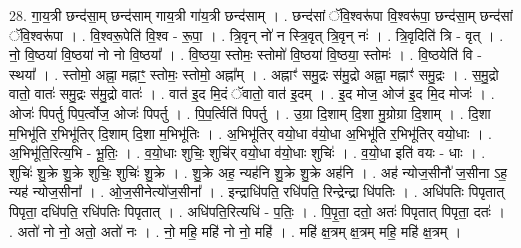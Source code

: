 \documentclass[17pt]{extarticle}
\begin{document}
28. गा॒य॒त्री छन्द॑सा॒म् छन्द॑साम् गाय॒त्री गा॑य॒त्री छन्द॑साम् । . छन्द॑सां ॅवि॒श्वरू॑पा वि॒श्वरू॑पा॒ छन्द॑सा॒म् छन्द॑सां ॅवि॒श्वरू॑पा । . वि॒श्वरू॒पेति॑ वि॒श्व - रू॒पा॒ । . त्रि॒वृन् नो॑ न स्त्रि॒वृत् त्रि॒वृन् नः॑ । . त्रि॒वृदिति॑ त्रि - वृत् । . नो॒ वि॒ष्ठया॑ वि॒ष्ठया॑ नो नो वि॒ष्ठया᳚ । . वि॒ष्ठया॒ स्तोमः॒ स्तोमो॑ वि॒ष्ठया॑ वि॒ष्ठया॒ स्तोमः॑ । . वि॒ष्ठयेति॑ वि - स्थया᳚ । . स्तोमो॒ अह्ना॒ मह्नाꣳ॒॒ स्तोमः॒ स्तोमो॒ अह्ना᳚म् । . अह्नाꣳ॑ समु॒द्रः स॑मु॒द्रो अह्ना॒ मह्नाꣳ॑ समु॒द्रः । . स॒मु॒द्रो वातो॒ वातः॑ समु॒द्रः स॑मु॒द्रो वातः॑ । . वात॑ इ॒द मि॒दं ॅवातो॒ वात॑ इ॒दम् । . इ॒द मोज॒ ओज॑ इ॒द मि॒द मोजः॑ । . ओजः॑ पिपर्तु पिप॒र्त्वोज॒ ओजः॑ पिपर्तु । . पि॒प॒र्त्विति॑ पिपर्तु । . उ॒ग्रा दि॒शाम् दि॒शा मु॒ग्रोग्रा दि॒शाम् । . दि॒शा म॒भिभू॑ति र॒भिभू॑तिर् दि॒शाम् दि॒शा म॒भिभू॑तिः । . अ॒भिभू॑तिर् वयो॒धा व॑यो॒धा अ॒भिभू॑ति र॒भिभू॑तिर् वयो॒धाः । . अ॒भिभू॑ति॒रित्य॒भि - भू॒तिः॒ । . व॒यो॒धाः शुचिः॒ शुचि॑र् वयो॒धा व॑यो॒धाः शुचिः॑ । . व॒यो॒धा इति॑ वयः - धाः । . शुचिः॑ शु॒क्रे शु॒क्रे शुचिः॒ शुचिः॑ शु॒क्रे । . शु॒क्रे अह॒ न्यह॑नि शु॒क्रे शु॒क्रे अह॑नि । . अह॑ न्योज॒सीनौ॑ ज॒सीना ऽह॒ न्यह॑ न्योज॒सीना᳚ । . ओ॒ज॒सीनेत्यो॑ज॒सीना᳚ । . इन्द्राधि॑पति॒ रधि॑पति॒ रिन्द्रेन्द्रा धि॑पतिः । . अधि॑पतिः पिपृतात् पिपृता॒ दधि॑पति॒ रधि॑पतिः पिपृतात् । . अधि॑पति॒रित्यधि॑ - प॒तिः॒ । . पि॒पृ॒ता॒ दतो॒ अतः॑ पिपृतात् पिपृता॒ दतः॑ । . अतो॑ नो नो॒ अतो॒ अतो॑ नः । . नो॒ महि॒ महि॑ नो नो॒ महि॑ । . महि॑ क्ष॒त्रम् क्ष॒त्रम् महि॒ महि॑ क्ष॒त्रम् । \newline
\end{document}
